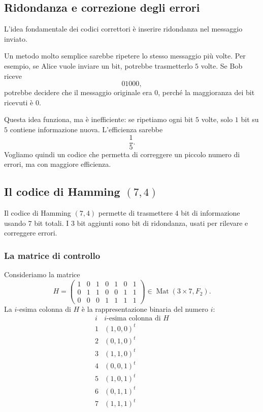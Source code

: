 \documentclass[a4paper]{article}
\begin{document}
\subsection{Ridondanza e correzione degli errori}

L'idea fondamentale dei codici correttori è inserire ridondanza nel messaggio inviato.

Un metodo molto semplice sarebbe ripetere lo stesso messaggio più volte. Per esempio, se Alice vuole inviare un bit, potrebbe trasmetterlo \(5\) volte. Se Bob riceve
\[
    01000,
\]
potrebbe decidere che il messaggio originale era \(0\), perché la maggioranza dei bit ricevuti è \(0\).

Questa idea funziona, ma è inefficiente: se ripetiamo ogni bit \(5\) volte, solo \(1\) bit su \(5\) contiene informazione nuova. L'efficienza sarebbe
\[
    \frac{1}{5}.
\]
Vogliamo quindi un codice che permetta di correggere un piccolo numero di errori, ma con maggiore efficienza.

\subsection{Il codice di Hamming \((7,4)\)}

Il codice di Hamming \((7,4)\) permette di trasmettere \(4\) bit di informazione usando \(7\) bit totali. I \(3\) bit aggiunti sono bit di ridondanza, usati per rilevare e correggere errori.

\subsubsection{La matrice di controllo}

Consideriamo la matrice
\[
    H=
    \begin{pmatrix}
        1 & 0 & 1 & 0 & 1 & 0 & 1\\
        0 & 1 & 1 & 0 & 0 & 1 & 1\\
        0 & 0 & 0 & 1 & 1 & 1 & 1
    \end{pmatrix}
    \in
    \operatorname{Mat}(3\times 7,F_2).
\]
La \(i\)-esima colonna di \(H\) è la rappresentazione binaria del numero \(i\):
\[
    \begin{array}{c|c}
        i & \text{\(i\)-esima colonna di \(H\)}\\
        \hline
        1 & (1,0,0)^t\\
        2 & (0,1,0)^t\\
        3 & (1,1,0)^t\\
        4 & (0,0,1)^t\\
        5 & (1,0,1)^t\\
        6 & (0,1,1)^t\\
        7 & (1,1,1)^t
    \end{array}
\]
\end{document}
